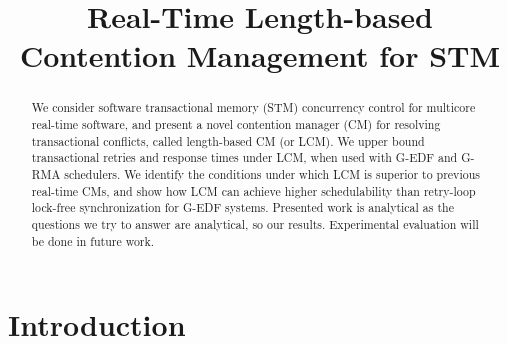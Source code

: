 \documentclass[conference]{IEEEtran}
\begin{document}
\title{Real-Time Length-based Contention Management for STM}

\maketitle

\begin{abstract}
We consider software transactional memory (STM) concurrency control for multicore real-time software, and present a novel contention manager (CM) for resolving transactional conflicts, called length-based CM (or LCM). We upper bound transactional retries and response times under LCM, when used with G-EDF and  G-RMA schedulers. We identify the conditions under which LCM is superior to previous real-time CMs, and show how LCM can achieve higher schedulability than retry-loop lock-free synchronization for G-EDF systems. %
Presented work is analytical as the questions we try to answer are analytical, so our results. Experimental evaluation will be done in future work.
\end{abstract}


\section{Introduction}
\label{sec:intro}
\end{document}
